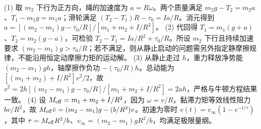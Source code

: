 (1) 取 \(m_2\) 下行为正方向，绳的加速度为 \(a=R\dot\omega\)。两个质量满足 \(m_2g-T_2=m_2a\)、\(T_1-m_1g=m_1a\)；滑轮满足 \((T_2-T_1)R-\tau_0=I a/R\)。消元得到 \(a=[(m_2-m_1)g-\tau_0/R]/[m_1+m_2+I/R^2]\)。
(2) 代回得 \(T_1=m_1(g+a)\)、\(T_2=m_2(g-a)\)，可检验 \(T_2-T_1=Ia/R^2+\tau_0/R\)。所设 \(m_2\) 下行且持续加速要求 \((m_2-m_1)g>\tau_0/R\)；若不满足，则从静止启动的问题需另外指定静摩擦规律，不能沿用恒定动摩擦力矩的运动解。
(3) 从静止走过 \(h\)，重力释放净势能 \((m_2-m_1)gh\)，轴摩擦作负功 \(-(\tau_0/R)h\)。总动能为 \([(m_1+m_2)+I/R^2]v^2/2\)，故 \(v^2=2h[(m_2-m_1)g-\tau_0/R]/[m_1+m_2+I/R^2]=2ah\)，严格与牛顿方程结果一致。
(4) 设 \(M_{\rm eff}=m_1+m_2+I/R^2\)，因为 \(\omega=v/R\)，黏滞力矩等效线性阻力 \(bv/R^2\)，故 \(M_{\rm eff}\dot v=(m_2-m_1)g-(b/R^2)v\)。初速为零时 \(v(t)=v_\infty(1-e^{-t/\tau})\)，其中 \(\tau=M_{\rm eff}R^2/b\)、\(v_\infty=(m_2-m_1)gR^2/b\)，均满足极限量纲。

